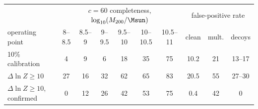 \begin{tabular}{@{}lccccccccc@{}}
\toprule
 & \multicolumn{6}{c}{$c=60$ completeness, $\log_{10}(M_{200}/\Msun)$} & \multicolumn{3}{c}{false-positive rate} \\
operating point & 8--8.5 & 8.5--9 & 9--9.5 & 9.5--10 & 10--10.5 & 10.5--11 & clean & mult. & decoys \\
\midrule
10\% calibration & 4 & 9 & 6 & 18 & 35 & 75 & 10.2 & 21 & 13--17 \\
$\Delta\ln Z\ge10$ & 27 & 16 & 32 & 62 & 65 & 83 & 20.5 & 55 & 27--30 \\
$\Delta\ln Z\ge10$, confirmed & 0 & 12 & 26 & 42 & 53 & 75 & 0.4 & 42 & 0 \\
\bottomrule
\end{tabular}
